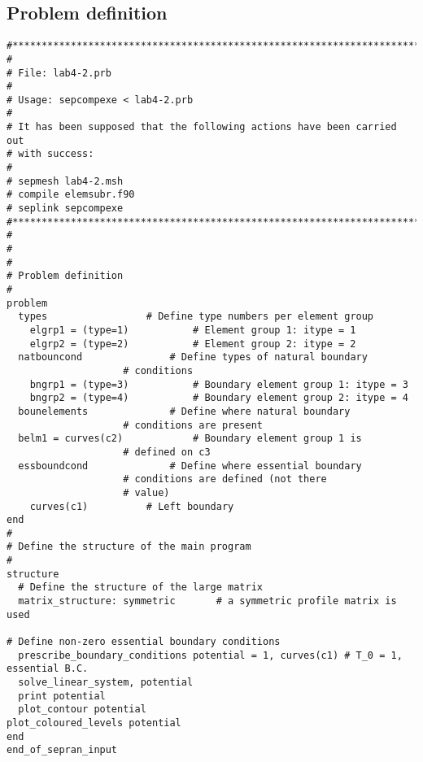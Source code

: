 \subsection{Problem definition}\label{ap:prb}
\begin{lstlisting}
#*****************************************************************************
#
# File: lab4-2.prb
#
# Usage: sepcompexe < lab4-2.prb
#
# It has been supposed that the following actions have been carried out
# with success:
#
# sepmesh lab4-2.msh
# compile elemsubr.f90
# seplink sepcompexe
#*****************************************************************************
#
#
#
# Problem definition
#
problem
  types					# Define type numbers per element group
    elgrp1 = (type=1)			# Element group 1: itype = 1
    elgrp2 = (type=2)			# Element group 2: itype = 2
  natbouncond				# Define types of natural boundary
					# conditions
    bngrp1 = (type=3)			# Boundary element group 1: itype = 3
    bngrp2 = (type=4)			# Boundary element group 2: itype = 4
  bounelements				# Define where natural boundary
					# conditions are present
  belm1 = curves(c2)			# Boundary element group 1 is
					# defined on c3
  essboundcond				# Define where essential boundary
					# conditions are defined (not there
					# value)
	curves(c1)			# Left boundary	
end
#
# Define the structure of the main program
#
structure
  # Define the structure of the large matrix
  matrix_structure: symmetric 		# a symmetric profile matrix is used
  
# Define non-zero essential boundary conditions
  prescribe_boundary_conditions potential = 1, curves(c1) # T_0 = 1, essential B.C.
  solve_linear_system, potential
  print potential
  plot_contour potential
plot_coloured_levels potential
end
end_of_sepran_input

\end{lstlisting}